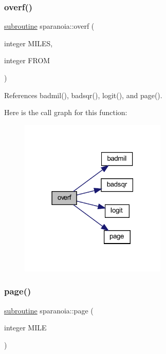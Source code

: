 \mbox{\label{sparanoia_8f90_a38d9bdfaf7f831fbe65011a823b5b39d}} 
\subsubsection{\texorpdfstring{overf()}{overf()}}
{\footnotesize\ttfamily \hyperlink{M__stopwatch_83_8txt_acfbcff50169d691ff02d4a123ed70482}{subroutine} sparanoia\+::overf (\begin{DoxyParamCaption}\item[{integer}]{M\+I\+L\+ES,  }\item[{integer}]{F\+R\+OM }\end{DoxyParamCaption})}



References badmil(), badsqr(), logit(), and page().

Here is the call graph for this function\+:
\nopagebreak
\begin{figure}[H]
\begin{center}
\leavevmode
\includegraphics[width=198pt]{sparanoia_8f90_a38d9bdfaf7f831fbe65011a823b5b39d_cgraph}
\end{center}
\end{figure}
\mbox{\label{sparanoia_8f90_a163adc8cbfccbae31bb2adb72adeb9b0}} 
\subsubsection{\texorpdfstring{page()}{page()}}
{\footnotesize\ttfamily \hyperlink{M__stopwatch_83_8txt_acfbcff50169d691ff02d4a123ed70482}{subroutine} sparanoia\+::page (\begin{DoxyParamCaption}\item[{integer}]{M\+I\+LE }\end{DoxyParamCaption})}

